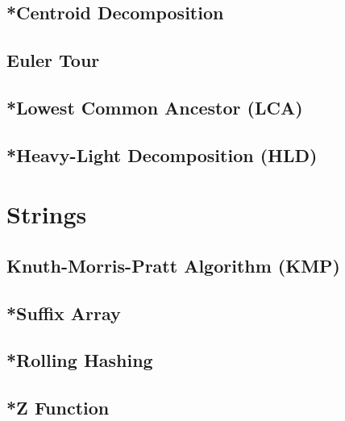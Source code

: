 \documentclass[letterpaper,landscape]{article}
\begin{document}
\subsection{*Centroid Decomposition}

\subsection{Euler Tour}



\subsection{*Lowest Common Ancestor (LCA)}

\subsection{*Heavy-Light Decomposition (HLD)}

\section{Strings}

\subsection{Knuth-Morris-Pratt Algorithm (KMP)}



\subsection{*Suffix Array}

\subsection{*Rolling Hashing}

\subsection{*Z Function}
\end{document}
